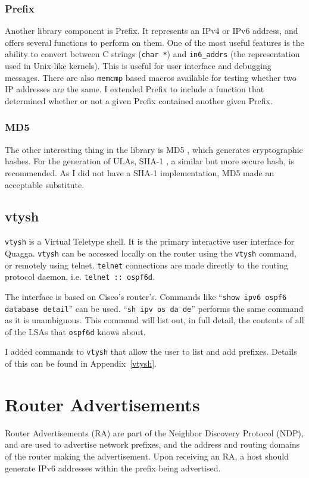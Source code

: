 \documentclass[12pt,a4paper,twoside]{report}
\begin{document}
\subsubsection{Prefix}
Another library component is Prefix. It represents an IPv4 or IPv6 address, and
offers several functions to perform on them. One of the most useful features is
the ability to convert between C strings (\texttt{char *}) and
\texttt{in6\_addrs} (the representation used in Unix-like kernels). This is
useful for user interface and debugging messages.  There are also
\texttt{memcmp} based macros available for testing whether two IP addresses are
the same. I extended Prefix to include a function that determined whether or
not a given Prefix contained another given Prefix.

\subsubsection{MD5}
The other interesting thing in the library is MD5
, which generates cryptographic
hashes. For the generation of ULAs, SHA-1 , a similar but more secure hash, is recommended. As I did not have
a SHA-1 implementation, MD5 made an acceptable substitute. 

\subsection{vtysh}
\texttt{vtysh}  is a
Virtual Teletype shell. It is the primary interactive user interface for
Quagga. \texttt{vtysh} can be accessed locally on the router using the
\texttt{vtysh} command, or remotely using telnet. \texttt{telnet} connections
are made directly to the routing protocol daemon, i.e. \texttt{telnet ::
ospf6d}.  

The interface is based on Cisco's router's. Commands like ``\texttt{show ipv6
ospf6 database detail}'' can be used. ``\texttt{sh ipv os da de}''  
performs the same command as it is unambiguous. This command will
list out, in full detail, the contents of all of the LSAs that \texttt{ospf6d}
knows about. 

I added commands to \texttt{vtysh} that allow the user to list and add
prefixes. Details of this can be found in Appendix~\ref{vtysh}. 

\section{Router Advertisements}
Router Advertisements (RA)  are part of
the Neighbor Discovery Protocol (NDP),  and are used to advertise network prefixes, and the address and
routing domains of the router making the advertisement. Upon receiving
an RA, a host should generate IPv6 addresses within the prefix being advertised. 
\end{document}
